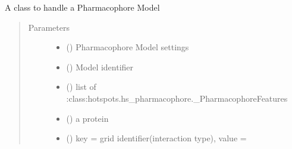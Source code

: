 \documentclass[letterpaper,10pt,english]{sphinxmanual}
\begin{document}
\begin{fulllineitems}
\label{\detokenize{hs_pharmacophore_api:hotspots.hs_pharmacophore.PharmacophoreModel}}
A class to handle a Pharmacophore Model
\begin{quote}\begin{description}
\item[{Parameters}] \leavevmode\begin{itemize}
\item {} 
 ({\hyperref[\detokenize{hs_pharmacophore_api:hotspots.hs_pharmacophore.PharmacophoreModel.Settings}]{}}) \textendash{} Pharmacophore Model settings

\item {} 
 () \textendash{} Model identifier

\item {} 
 () \textendash{} list of  :class:hotspots.hs\_pharmacophore.\_PharmacophoreFeatures

\item {} 
 () \textendash{} a protein

\item {} 
 () \textendash{} key = grid identifier(interaction type), value = 

\end{itemize}

\end{description}\end{quote}


\end{fulllineitems}
\end{document}
